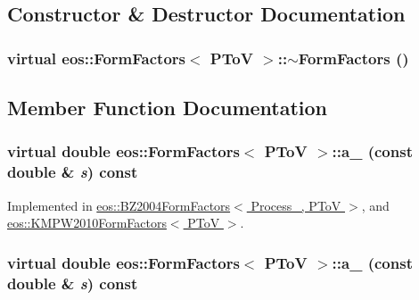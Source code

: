 \subsection{Constructor \& Destructor Documentation}
\hypertarget{classeos_1_1FormFactors_3_01PToV_01_4_ad5af6b693cab6af9a9e5804165b9f465}{
\subsubsection[{$\sim$FormFactors}]{\setlength{\rightskip}{0pt plus 5cm}virtual eos::FormFactors$<$ {\bf PToV} $>$::$\sim$FormFactors ()}}
\label{classeos_1_1FormFactors_3_01PToV_01_4_ad5af6b693cab6af9a9e5804165b9f465}


\subsection{Member Function Documentation}
\hypertarget{classeos_1_1FormFactors_3_01PToV_01_4_ac1f21721a19b71abb3e3a433793db159}{
\subsubsection[{a\_\-0}]{\setlength{\rightskip}{0pt plus 5cm}virtual double eos::FormFactors$<$ {\bf PToV} $>$::a\_ (const double \& {\em s}) const}}
\label{classeos_1_1FormFactors_3_01PToV_01_4_ac1f21721a19b71abb3e3a433793db159}


Implemented in \hyperlink{classeos_1_1BZ2004FormFactors_3_01Process___00_01PToV_01_4_a67cc70f2263f1dfec23057c36060ef22}{eos::BZ2004FormFactors$<$ Process\_\-, PToV $>$}, and \hyperlink{classeos_1_1KMPW2010FormFactors_3_01PToV_01_4_a05b86cc4ef009a2f08fb91595ec9dd0c}{eos::KMPW2010FormFactors$<$ PToV $>$}.\hypertarget{classeos_1_1FormFactors_3_01PToV_01_4_a0d6fdeca880da81163bbcdca7057bdcb}{
\subsubsection[{a\_\-1}]{\setlength{\rightskip}{0pt plus 5cm}virtual double eos::FormFactors$<$ {\bf PToV} $>$::a\_ (const double \& {\em s}) const}}
\label{classeos_1_1FormFactors_3_01PToV_01_4_a0d6fdeca880da81163bbcdca7057bdcb}


